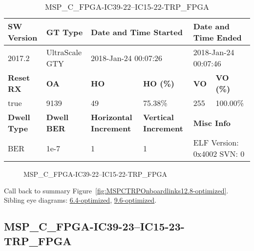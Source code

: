 \begin{table}[h]
\centering
\caption{MSP\_C\_FPGA-IC39-22--IC15-22-TRP\_FPGA}
\label{tab:MSPCFPGAIC3922IC1522TRPFPGA12.8-optimized}
\begin{tabular}{@{}|l|l|l|l|l|l|@{}}
\toprule
\textbf{SW Version}                & \textbf{GT Type}   & \multicolumn{2}{l|}{\textbf{Date and Time Started}}            & \multicolumn{2}{l|}{\textbf{Date and Time Ended}}        \\ \midrule
2017.2                       & UltraScale GTY          & \multicolumn{2}{l|}{2018-Jan-24 00:07:26}                   & \multicolumn{2}{l|}{2018-Jan-24 00:07:46}               \\ \midrule
\textbf{Reset RX}                  & \textbf{OA} & \textbf{HO}   & \textbf{HO (\%)} & \textbf{VO} & \textbf{VO (\%)} \\ \midrule
true & 9139        & 49          & 75.38\%        & 255        & 100.00\%       \\ \midrule
\textbf{Dwell Type}                & \textbf{Dwell BER} & \textbf{Horizontal Increment} & \textbf{Vertical Increment}    & \multicolumn{2}{l|}{\textbf{Misc Info}}                  \\ \midrule
BER                            & 1e-7        & 1        & 1           & \multicolumn{2}{l|}{ELF Version: 0x4002 SVN: 0}                         \\ \bottomrule
\end{tabular}
\end{table}

\begin{figure}[h]
\caption{MSP\_C\_FPGA-IC39-22--IC15-22-TRP\_FPGA} \label{fig:MSPCFPGAIC3922IC1522TRPFPGA12.8-optimized}
\end{figure}

Call back to summary Figure~\ref{fig:MSPCTRPOnboardlinks12.8-optimized}.
Sibling eye diagrams: \hyperref[sec:MSPCFPGAIC3922IC1522TRPFPGA6.4-optimized]{6.4-optimized}, \hyperref[sec:MSPCFPGAIC3922IC1522TRPFPGA9.6-optimized]{9.6-optimized}.

\clearpage
\newpage


\subsection{MSP\_C\_FPGA-IC39-23--IC15-23-TRP\_FPGA}\label{sec:MSPCFPGAIC3923IC1523TRPFPGA12.8-optimized}

